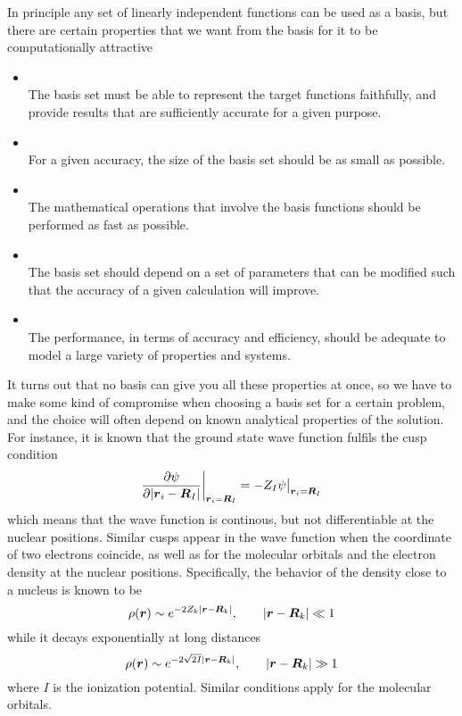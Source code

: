 In principle any set of linearly independent functions can be used as a basis, but there are
certain properties that we want from the basis for it to be computationally attractive\cite{Losilla}
\begin{itemize}
    \item {}\\
	The basis set must be able to represent the target functions faithfully, and provide
	results that are sufficiently accurate for a given purpose.
    \item {}\\
	For a given accuracy, the size of the basis set should be as small as possible.
    \item {}\\
	The mathematical operations that involve the basis functions should be performed as 
	fast as possible.
    \item {}\\
	The basis set should depend on a set of parameters that can be modified such that the 
	accuracy of a given calculation will improve.
    \item {}\\
	The performance, in terms of accuracy and efficiency, should be adequate to model a large 
	variety of properties and systems.
\end{itemize}
It turns out that no basis can give you all these properties at once, so we have to make some 
kind of compromise when choosing a basis set for a certain problem, and the choice will often 
depend on known analytical properties of the solution. For instance, it is known that the ground
state wave function fulfils the cusp condition\cite{cusp}
\begin{equation}
    \frac{\partial \psi}{\partial |\boldsymbol r_i - \boldsymbol R_I|}\bigg|_{\boldsymbol r_i=\boldsymbol R_I} 
	= -Z_I\psi\big|_{\boldsymbol r_i=\boldsymbol R_I}
\end{equation}
which means that the wave function is continous, but not differentiable at the nuclear positions.
Similar cusps appear in the wave function when the coordinate of two electrons coincide, as well 
as for the molecular orbitals and the electron density at the nuclear positions. Specifically, the
behavior of the density close to a nucleus is known to be
\begin{equation}
    \rho(\boldsymbol r) \sim e^{-2Z_k|\boldsymbol r-\boldsymbol R_k|}, \qquad |\boldsymbol r-\boldsymbol R_k| \ll 1
\end{equation}
while it decays exponentially at long distances 
\begin{equation}
    \rho(\boldsymbol r) \sim e^{-2\sqrt{2I}|\boldsymbol r-\boldsymbol R_k|}, \qquad |\boldsymbol r - \boldsymbol R_k| \gg 1
\end{equation}
where $I$ is the ionization potential. Similar conditions apply for the molecular orbitals.

